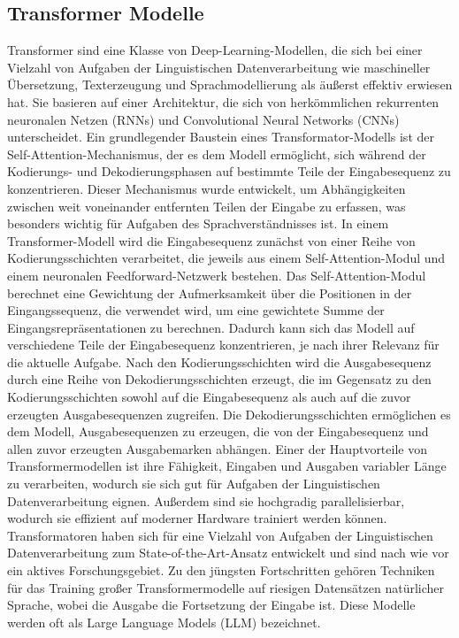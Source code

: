 \subsection{Transformer Modelle}
\label{subsec:SecondContent:SecondSection}
Transformer sind eine Klasse von Deep-Learning-Modellen, die sich bei einer Vielzahl von Aufgaben der Linguistischen Datenverarbeitung wie maschineller Übersetzung, Texterzeugung und Sprachmodellierung als äußerst effektiv erwiesen hat.
Sie basieren auf einer Architektur, die sich von herkömmlichen rekurrenten neuronalen Netzen (RNNs) und Convolutional Neural Networks (CNNs) unterscheidet.
Ein grundlegender Baustein eines Transformator-Modells ist der Self-Attention-Mechanismus, der es dem Modell ermöglicht, sich während der Kodierungs- und Dekodierungsphasen auf bestimmte Teile der Eingabesequenz zu konzentrieren.
Dieser Mechanismus wurde entwickelt, um Abhängigkeiten zwischen weit voneinander entfernten Teilen der Eingabe zu erfassen, was besonders wichtig für Aufgaben des Sprachverständnisses ist.
In einem Transformer-Modell wird die Eingabesequenz zunächst von einer Reihe von Kodierungsschichten verarbeitet, die jeweils aus einem Self-Attention-Modul und einem neuronalen Feedforward-Netzwerk bestehen.
Das Self-Attention-Modul berechnet eine Gewichtung der Aufmerksamkeit über die Positionen in der Eingangssequenz, die verwendet wird, um eine gewichtete Summe der Eingangsrepräsentationen zu berechnen.
Dadurch kann sich das Modell auf verschiedene Teile der Eingabesequenz konzentrieren, je nach ihrer Relevanz für die aktuelle Aufgabe.
Nach den Kodierungsschichten wird die Ausgabesequenz durch eine Reihe von Dekodierungsschichten erzeugt, die im Gegensatz zu den Kodierungsschichten sowohl auf die Eingabesequenz als auch auf die zuvor erzeugten Ausgabesequenzen zugreifen.
Die Dekodierungsschichten ermöglichen es dem Modell, Ausgabesequenzen zu erzeugen, die von der Eingabesequenz und allen zuvor erzeugten Ausgabemarken abhängen.
Einer der Hauptvorteile von Transformermodellen ist ihre Fähigkeit, Eingaben und Ausgaben variabler Länge zu verarbeiten, wodurch sie sich gut für Aufgaben der Linguistischen Datenverarbeitung eignen.
Außerdem sind sie hochgradig parallelisierbar, wodurch sie effizient auf moderner Hardware trainiert werden können.
Transformatoren haben sich für eine Vielzahl von Aufgaben der Linguistischen Datenverarbeitung zum State-of-the-Art-Ansatz entwickelt und sind nach wie vor ein aktives Forschungsgebiet.
Zu den jüngsten Fortschritten gehören Techniken für das Training großer Transformermodelle auf riesigen Datensätzen natürlicher Sprache, wobei die Ausgabe die Fortsetzung der Eingabe ist.
Diese Modelle werden oft als Large Language Models (LLM) bezeichnet.


